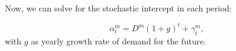 Now, we can solve for the stochastic intercept in each period:

\begin{equation*}
  \alpha^m_t=D^m(1+g)^t+\gamma^m_t,
\end{equation*}
with $g$ as yearly growth rate of demand for the future.






